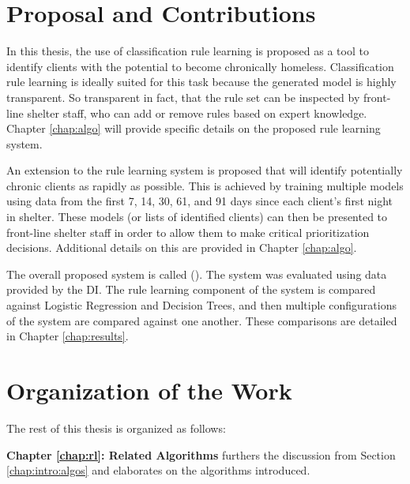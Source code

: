 

\section{Proposal and Contributions}\label{chap:intro:contrib}

In this thesis, the use of classification rule learning is proposed as a tool to identify clients with the potential to become chronically homeless.
Classification rule learning is ideally suited for this task because the generated model is highly transparent. So transparent in fact, that the rule set can be inspected by front-line shelter staff, who can add or remove rules based on expert knowledge. Chapter \ref{chap:algo} will provide specific details on the proposed rule learning system.

An extension to the rule learning system is proposed that will identify potentially chronic clients as rapidly as possible. This is achieved by training multiple models using data from the first 7, 14, 30, 61, and 91 days since each client's first night in shelter. These models (or lists of identified clients) can then be presented to front-line shelter staff in order to allow them to make critical prioritization decisions. Additional details on this are provided in Chapter \ref{chap:algo}.

The overall proposed system is called \Name (\Abb). The \Abb system was evaluated using data provided by the DI. The rule learning component of the system is compared against Logistic Regression and Decision Trees, and then multiple configurations of the \Abb system are compared against one another. These comparisons are detailed in Chapter \ref{chap:results}.


\section{Organization of the Work}\label{chap:intro:org}


The rest of this thesis is organized as follows:

\textbf{Chapter \ref{chap:rl}: Related Algorithms} furthers the discussion from Section \ref{chap:intro:algos} and elaborates on the algorithms introduced.

